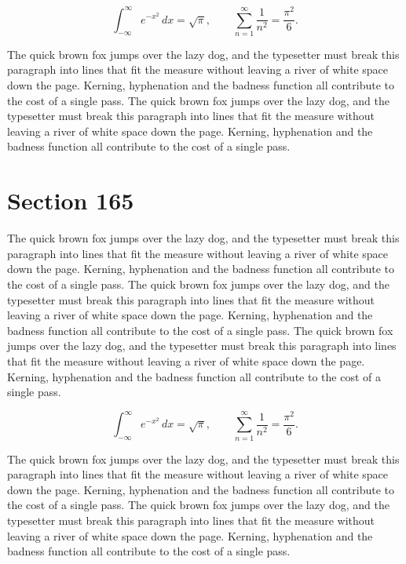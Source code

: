 \documentclass{article}
\begin{document}
\begin{equation}
\int_{-\infty}^{\infty} e^{-x^{2}}\,dx = \sqrt{\pi}, \qquad
\sum_{n=1}^{\infty} \frac{1}{n^{2}} = \frac{\pi^{2}}{6}.
\end{equation}

The quick brown fox jumps over the lazy dog, and the typesetter must break this paragraph into lines that fit the measure without leaving a river of white space down the page. Kerning, hyphenation and the badness function all contribute to the cost of a single pass. The quick brown fox jumps over the lazy dog, and the typesetter must break this paragraph into lines that fit the measure without leaving a river of white space down the page. Kerning, hyphenation and the badness function all contribute to the cost of a single pass. 
\section{Section 165}
The quick brown fox jumps over the lazy dog, and the typesetter must break this paragraph into lines that fit the measure without leaving a river of white space down the page. Kerning, hyphenation and the badness function all contribute to the cost of a single pass. The quick brown fox jumps over the lazy dog, and the typesetter must break this paragraph into lines that fit the measure without leaving a river of white space down the page. Kerning, hyphenation and the badness function all contribute to the cost of a single pass. The quick brown fox jumps over the lazy dog, and the typesetter must break this paragraph into lines that fit the measure without leaving a river of white space down the page. Kerning, hyphenation and the badness function all contribute to the cost of a single pass. 

\begin{equation}
\int_{-\infty}^{\infty} e^{-x^{2}}\,dx = \sqrt{\pi}, \qquad
\sum_{n=1}^{\infty} \frac{1}{n^{2}} = \frac{\pi^{2}}{6}.
\end{equation}

The quick brown fox jumps over the lazy dog, and the typesetter must break this paragraph into lines that fit the measure without leaving a river of white space down the page. Kerning, hyphenation and the badness function all contribute to the cost of a single pass. The quick brown fox jumps over the lazy dog, and the typesetter must break this paragraph into lines that fit the measure without leaving a river of white space down the page. Kerning, hyphenation and the badness function all contribute to the cost of a single pass. 
\end{document}
